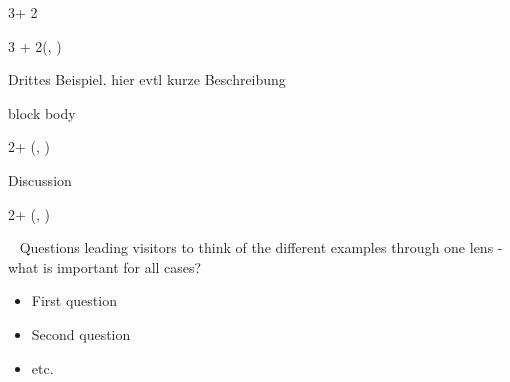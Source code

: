 \documentclass{beamer}
\newlength{\blockThree}
\newlength{\blockFour}
\begin{document}
\begin{frame}[t]
\begin{textblock*}{3\colwidth + 2\colsep}
\end{textblock*}



\begin{textblock*}{3 \colwidth + 2\colsep}(\leftmargin, \blockThree)

\begin{alertblock}{%
	\begin{minipage}[b]{60pt}
		\RaggedRight
		\noindent\hspace{-10pt}
	\end{minipage}%
	\begin{minipage}[b]{2\colwidth+\colsep-125pt}\strut%
		Drittes Beispiel.\; {\mdseries hier evtl kurze Beschreibung}
	\end{minipage}%
}
	\begin{beamercolorbox}[
		ht = 19.75cm, 
		wd = 0.9\linewidth, 
		center
		]{block body}
		\par
	\end{beamercolorbox}
\end{alertblock}

\end{textblock*}



\TPshowboxesfalse



\begin{textblock*}{2\colwidth + \colsep}(\leftmargin, \blockFour)

\begin{parblock}{Discussion}
\end{parblock}

\end{textblock*}




\begin{textblock*}{2\colwidth + \colsep}(\leftmargin, \blockFour)

\begin{parblock}{~}  %
	\alert{Questions leading visitors to think of the different examples through one lens - what is important for all cases?}\vspace{0.333333\baselineskip}
	\begin{itemize}
	\item[1.] First question
	\item[2.] Second question
	\item[3.] etc.  
	\end{itemize}


\end{parblock}
\end{textblock*}
\end{frame}
\end{document}
